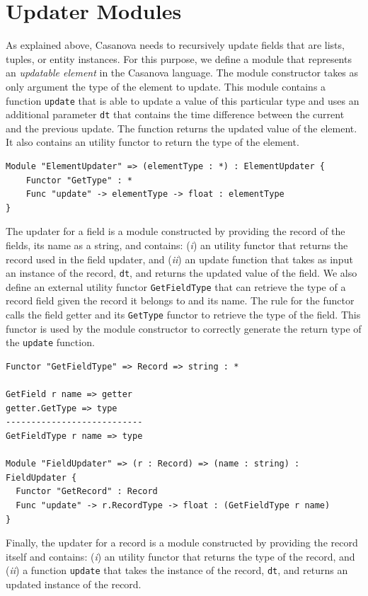 \section{Updater Modules}
\label{subsec:ch_networking_updater_modules}
As explained above, Casanova needs to recursively update fields that are lists, tuples, or entity instances. For this purpose, we define a module that represents an \textit{updatable element} in the Casanova language. The module constructor takes as only argument the type of the element to update. This module contains a function \texttt{update} that is able to update a value of this particular type and uses an additional parameter \texttt{dt} that contains the time difference between the current and the previous update. The function returns the updated value of the element. It also contains an utility functor to return the type of the element.
 
\begin{lstlisting}
Module "ElementUpdater" => (elementType : *) : ElementUpdater {
	Functor "GetType" : *
	Func "update" -> elementType -> float : elementType
}
\end{lstlisting}

\noindent
The updater for a field is a module constructed by providing the record of the fields, its name as a string, and contains: (\textit{i}) an utility functor that returns the record used in the field updater, and (\textit{ii}) an update function that takes as input an instance of the record, \texttt{dt}, and returns the updated value of the field. We also define an external utility functor \texttt{GetFieldType} that can retrieve the type of a record field given the record it belongs to and its name. The rule for the functor calls the field getter and its \texttt{GetType} functor to retrieve the type of the field. This functor is used by the module constructor to correctly generate the return type of the \texttt{update} function.

\begin{lstlisting}
Functor "GetFieldType" => Record => string : *

GetField r name => getter
getter.GetType => type
---------------------------
GetFieldType r name => type

Module "FieldUpdater" => (r : Record) => (name : string) : FieldUpdater {
  Functor "GetRecord" : Record
  Func "update" -> r.RecordType -> float : (GetFieldType r name)
}
\end{lstlisting}

\noindent
Finally, the updater for a record is a module constructed by providing the record itself and contains: (\textit{i}) an utility functor that returns the type of the record, and (\textit{ii}) a function \texttt{update} that takes the instance of the record, \texttt{dt}, and returns an updated instance of the record.

